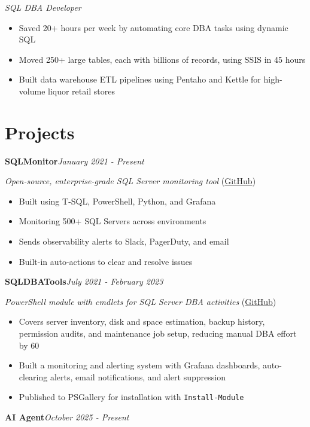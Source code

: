 \documentclass[10pt,a4paper]{article}
\begin{document}
\textit{SQL DBA Developer}\\[-5pt]
\begin{itemize}
  \item Saved 20+ hours per week by automating core DBA tasks using dynamic SQL
  \item Moved 250+ large tables, each with billions of records, using SSIS in 45 hours
  \item Built data warehouse ETL pipelines using Pentaho and Kettle for high-volume liquor retail stores
\end{itemize}

\section{Projects}

\noindent\textbf{SQLMonitor}\hfill \textit{January 2021 - Present}

\textit{Open-source, enterprise-grade SQL Server monitoring tool} (\href{https://github.com/imajaydwivedi/SQLMonitor}{GitHub})
\begin{itemize}
  \item Built using T-SQL, PowerShell, Python, and Grafana
  \item Monitoring 500+ SQL Servers across environments
  \item Sends observability alerts to Slack, PagerDuty, and email
  \item Built-in auto-actions to clear and resolve issues
\end{itemize}
\vspace{14.7pt}
\noindent\textbf{SQLDBATools}\hfill \textit{July 2021 - February 2023}

\textit{PowerShell module with cmdlets for SQL Server DBA activities} (\href{https://github.com/imajaydwivedi/SQLDBATools}{GitHub})
\begin{itemize}
  \item Covers server inventory, disk and space estimation, backup history, permission audits, and maintenance job setup, reducing manual DBA effort by 60%
  \item Built a monitoring and alerting system with Grafana dashboards, auto-clearing alerts, email notifications, and alert suppression
  \item Published to PSGallery for installation with \texttt{Install-Module}
\end{itemize}
\vspace{14.7pt}
\noindent\textbf{AI Agent}\hfill \textit{October 2025 - Present}
\end{document}
